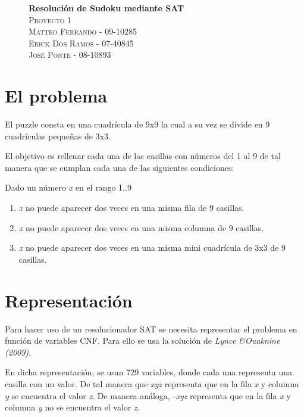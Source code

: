 \documentclass{article}
\begin{document}
\begin{figure}[t]
    \begin{center}
        { \LARGE \bfseries Resolución de Sudoku mediante SAT}\\[0.4cm]
        \textsc{Proyecto 1}\\[0.1cm]
        \textsc{Matteo Ferrando - 09-10285}\\[0.1cm]
        \textsc{Erick Dos Ramos - 07-40845}\\[0.1cm]
        \textsc{José Ponte - 08-10893}\\[0.1cm]
    \end{center}
\end{figure}


\clearpage


\section*{El problema}

El puzzle consta en una cuadrícula de 9x9 la cual a su vez se divide en 9 cuadrículas pequeñas de 3x3.

El objetivo es rellenar cada una de las casillas con números del 1 al 9 de tal manera que se cumplan cada una de las siguientes condiciones:

Dado un número \emph{x} en el rango {1..9}
\begin{enumerate}
    \item \emph{x} no puede aparecer dos veces en una misma fila de 9 casillas.
    \item \emph{x} no puede aparecer dos veces en una misma columna de 9 casillas.
    \item \emph{x} no puede aparecer dos veces en una misma mini cuadrícula de 3x3 de 9 casillas.
\end{enumerate}


\section*{Representación}

Para hacer uso de un resolucionador SAT se necesita representar el problema en función de variables CNF. Para ello se usa la solución de \emph{Lynce \&Ouaknine (2009)}.

En dicha representación, se usan 729 variables, donde cada una representa una casilla con un valor. De tal manera que \emph{xyz} representa que en la fila \emph{x} y columna \emph{y} se encuentra el valor \emph{z}. De manera análoga, \emph{-xyz} representa que en la fila \emph{x} y columna \emph{y} no se encuentra el valor \emph{z}.
\end{document}
